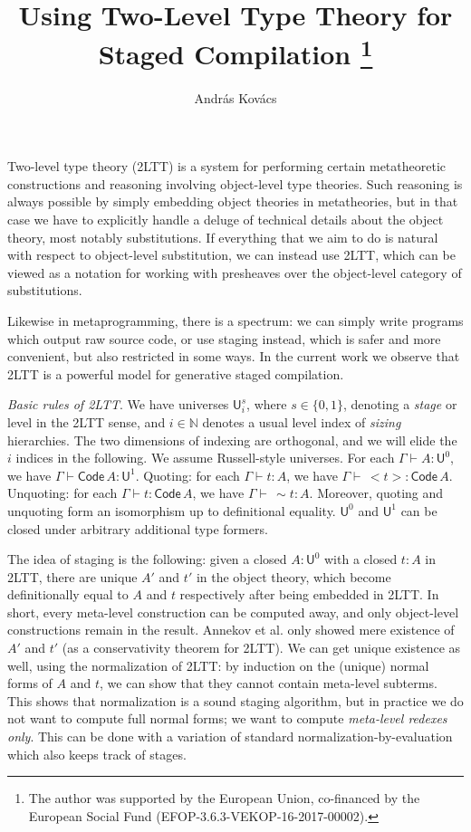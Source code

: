\documentclass{easychair}
\title{Using Two-Level Type Theory for Staged Compilation %
  \thanks{The author was supported by the European Union, co-financed
    by the European Social Fund (EFOP-3.6.3-VEKOP-16-2017-00002).}}
\author{
Andr\'as Kov\'acs
}
\institute{
  E\"otv\"os Lor\'and University,
  Budapest, Hungary \\
  \email{kovacsandras@inf.elte.hu}
}
\newcommand{\U}{\mathsf{U}}
\newcommand{\Code}{\mathsf{Code}}
\begin{document}
\maketitle

Two-level type theory \cite{twolevel} (2LTT) is a system for performing certain
metatheoretic constructions and reasoning involving object-level type
theories. Such reasoning is always possible by simply embedding object theories
in metatheories, but in that case we have to explicitly handle a deluge of
technical details about the object theory, most notably substitutions. If
everything that we aim to do is natural with respect to object-level
substitution, we can instead use 2LTT, which can be viewed as a notation for
working with presheaves over the object-level category of substitutions.

Likewise in metaprogramming, there is a spectrum: we can simply write programs
which output raw source code, or use staging instead, which is safer and more
convenient, but also restricted in some ways. In the current work we observe
that 2LTT is a powerful model for generative staged compilation.

\emph{Basic rules of 2LTT}. We have universes $\U^s_{i}$, where $s \in \{0,1\}$,
denoting a \emph{stage} or level in the 2LTT sense, and $i \in \mathbb{N}$
denotes a usual level index of \emph{sizing} hierarchies. The two dimensions of
indexing are orthogonal, and we will elide the $i$ indices in the following. We
assume Russell-style universes. For each $\Gamma \vdash A : \U^0$, we have
$\Gamma \vdash \Code\,A : \U^1$. Quoting: for each $\Gamma \vdash t : A$, we
have $\Gamma \vdash\,<\!t\!> : \Code\,A$. Unquoting: for each $\Gamma \vdash t :
\Code\,A$, we have $\Gamma \vdash\,\sim\!t : A$. Moreover, quoting and unquoting
form an isomorphism up to definitional equality. $\U^0$ and $\U^1$ can be closed
under arbitrary additional type formers.

The idea of staging is the following: given a closed $A : \U^0$ with a closed $t
: A$ in 2LTT, there are unique $A'$ and $t'$ in the object theory, which become
definitionally equal to $A$ and $t$ respectively after being embedded in
2LTT. In short, every meta-level construction can be computed away, and only
object-level constructions remain in the result. Annekov et al. \cite{twolevel}
only showed mere existence of $A'$ and $t'$ (as a conservativity theorem for
2LTT). We can get unique existence as well, using the normalization of 2LTT:
by induction on the (unique) normal forms of $A$ and $t$, we can show that they
cannot contain meta-level subterms. This shows that normalization is a sound
staging algorithm, but in practice we do not want to compute full normal forms;
we want to compute \emph{meta-level redexes only}. This can be done with a
variation of standard normalization-by-evaluation \cite{abel2013normalization,
  Wieczorek:2018:CFN:3176245.3167091} which also keeps track of stages.
\end{document}
